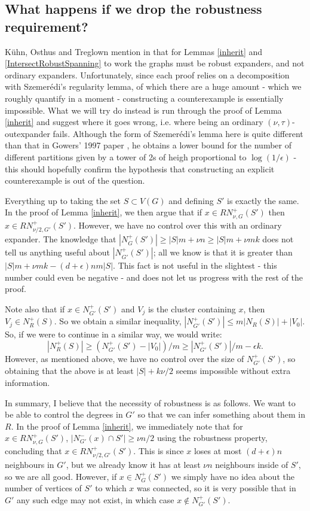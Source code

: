 \documentclass[10pt,letterpaper, reqno]{amsart}
\theoremstyle{definition}
\numberwithin{equation}{section}
\begin{document}
\subsection{What happens if we drop the robustness requirement?} K\"{u}hn, Osthus and Treglown mention in \cite{DegreeSequencesInDigraphs} that for Lemmas \ref{inherit} and \ref{IntersectRobustSpanning} to work the graphs must be robust expanders, and not ordinary expanders. Unfortunately, since each proof relies on a decomposition with Szemer\'{e}di's regularity lemma, of which there are a huge amount - which we roughly quantify in a moment - constructing a counterexample is essentially impossible. What we will try do instead is run through the proof of Lemma \ref{inherit} and suggest where it goes wrong, i.e. where being an ordinary $(\nu,\tau)$-outexpander fails. Although the form of Szemer\'{e}di's lemma here is quite different than that in Gowers' 1997 paper \cite{Gowers}, he obtains a lower bound for the number of different partitions given by a tower of 2s of heigh proportional to $\log(1/\epsilon)$ - this should hopefully confirm the hypothesis that constructing an explicit counterexample is out of the question.

Everything up to taking the set $S \subset V(G)$ and defining $S'$ is exactly the same. In the proof of Lemma \ref{inherit}, we then argue that if $x \in RN^+_{\nu,G}(S')$ then $x \in RN^+_{\nu/2, G'}(S')$. However, we have no control over this with an ordinary expander. The knowledge that $|N^+_{G}(S')| \geq |S|m + \nu n \geq |S|m + \nu mk$ does not tell us anything useful about $|N^+_{G'}(S')|$; all we know is that it is greater than $|S|m + \nu mk - (d+\epsilon)nm|S|$. This fact is not useful in the slightest - this number could even be negative - and does not let us progress with the rest of the proof. 

Note also that if $x \in N^+_{G'}(S')$ and $V_j$ is the cluster containing $x$, then $V_j \in N^+_{R}(S)$. So we obtain a similar inequality, $|N^+_{G'}(S')| \leq m|N_{R}(S)| + |V_0|$. So, if we were to continue in a similar way, we would write:
\begin{displaymath}
	|N^+_R(S)| \geq (N^+_{G'}(S') - |V_0|)/m \geq |N^+_{G'}(S')|/m - \epsilon k.
\end{displaymath}
However, as mentioned above, we have no control over the size of $N^+_{G'}(S')$, so obtaining that the above is at least $|S| + k\nu/2$ seems impossible without extra information.

In summary, I believe that the necessity of robustness is as follows. We want to be able to control the degrees in $G'$ so that we can infer something about them in $R$. In the proof of Lemma \ref{inherit}, we immediately note that for $x \in RN_{\nu,G}^+(S')$, $|N^-_{G'}(x) \cap S'| \geq \nu n/2$ using the robustness property, concluding that $x \in RN^+_{\nu/2,G'}(S')$. This is since $x$ loses at most $(d+\epsilon)n$ neighbours in $G'$, but we already know it has at least $\nu n$ neighbours inside of $S'$, so we are all good. However, if $x \in N^+_{G}(S')$ we simply have no idea about the number of vertices of $S'$ to which $x$ was connected, so it is very possible that in $G'$ any such edge may not exist, in which case $x \not \in N^+_{G'}(S')$.
\end{document}
